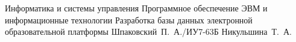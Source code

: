 \documentclass{bmstu}
\begin{document}
\renewcommand{\thelstlisting}{\arabic{lstlisting}}

\makecourseworktitle
    {Информатика и системы управления}
    {Программное обеспечение ЭВМ и информационные технологии}
    {Разработка базы данных электронной образовательной платформы}
    {Шпаковский~П.~А./ИУ7-63Б}
    {Никульшина~Т.~А.}
    {}

\maketableofcontents








\makebibliography


\end{document}
